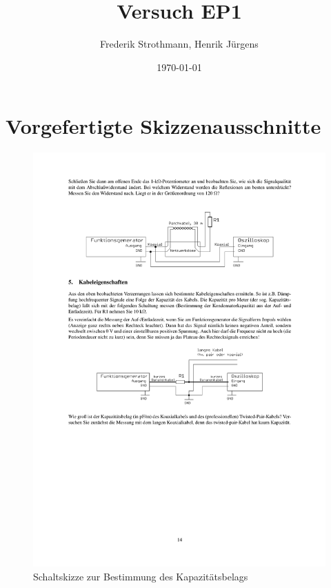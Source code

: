 \documentclass[12pt,a4paper]{article}
\title{Versuch EP1}
\author{Frederik Strothmann, Henrik Jürgens}
\date{\today}
\begin{document}
\maketitle
\newpage
\tableofcontents
\newpage

\section*{Vorgefertigte Skizzenausschnitte}









\begin{figure}[H] 
  \centering
    \includegraphics[trim = 10mm 110mm 10mm 140mm, clip, scale = 1]{4-5.pdf}
  	\caption[Schaltskizze zur Bestimmung des Kapazitätsbelags]{Schaltskizze zur Bestimmung des Kapazitätsbelags\footnotemark}
  \label{fig:5}
\end{figure}
\end{document}
